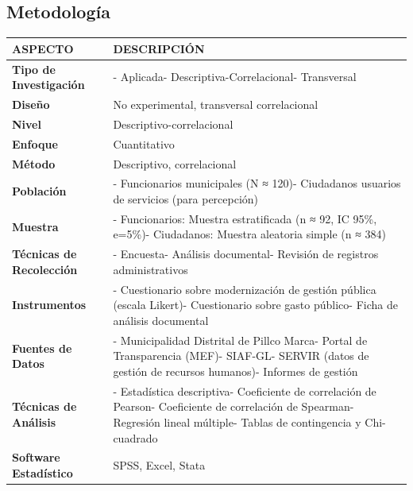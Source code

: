 \documentclass[
  man,
  floatsintext,
  longtable,
  a4paper,
  nolmodern,
  notxfonts,
  notimes,
  12pt,
  colorlinks=true,linkcolor=blue,citecolor=blue,urlcolor=blue]{apa7}
\newcounter{none} %
\begin{document}
\subsection{Metodología}\label{metodologuxeda-8}

{\def\LTcaptype{none} %
\begin{longtable}[]{@{}
  >{\raggedright\arraybackslash}p{}
  >{\raggedright\arraybackslash}p{}@{}}
\toprule\noalign{}
\begin{minipage}[b]{\linewidth}\raggedright
ASPECTO
\end{minipage} & \begin{minipage}[b]{\linewidth}\raggedright
DESCRIPCIÓN
\end{minipage} \\
\midrule\noalign{}
\endhead
\bottomrule\noalign{}
\endlastfoot
\textbf{Tipo de Investigación} & - Aplicada- Descriptiva-Correlacional-
Transversal \\
\textbf{Diseño} & No experimental, transversal correlacional \\
\textbf{Nivel} & Descriptivo-correlacional \\
\textbf{Enfoque} & Cuantitativo \\
\textbf{Método} & Descriptivo, correlacional \\
\textbf{Población} & - Funcionarios municipales (N ≈ 120)- Ciudadanos
usuarios de servicios (para percepción) \\
\textbf{Muestra} & - Funcionarios: Muestra estratificada (n ≈ 92, IC
95\%, e=5\%)- Ciudadanos: Muestra aleatoria simple (n ≈ 384) \\
\textbf{Técnicas de Recolección} & - Encuesta- Análisis documental-
Revisión de registros administrativos \\
\textbf{Instrumentos} & - Cuestionario sobre modernización de gestión
pública (escala Likert)- Cuestionario sobre gasto público- Ficha de
análisis documental \\
\textbf{Fuentes de Datos} & - Municipalidad Distrital de Pillco Marca-
Portal de Transparencia (MEF)- SIAF-GL- SERVIR (datos de gestión de
recursos humanos)- Informes de gestión \\
\textbf{Técnicas de Análisis} & - Estadística descriptiva- Coeficiente
de correlación de Pearson- Coeficiente de correlación de Spearman-
Regresión lineal múltiple- Tablas de contingencia y Chi-cuadrado \\
\textbf{Software Estadístico} & SPSS, Excel, Stata \\
\end{longtable}
}
\end{document}
